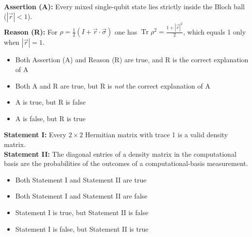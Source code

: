 \documentclass[11pt,a4paper]{article}
\newcommand{\optlabel}[1]{\textbf{(#1)}}
\newenvironment{qitem}[1]{\begin{list}{}{\setlength{\leftmargin}{3.3em}\setlength{\labelwidth}{3.1em}%
  \setlength{\labelsep}{0.2em}\setlength{\topsep}{3pt}\setlength{\parsep}{3pt}}\item[\textbf{Q.#1}\hfill]}{\end{list}}
\newcommand{\qsep}{\par\vspace{2pt}{\color{black!15}\hrule}\vspace{4pt}}
\begin{document}
\begin{qitem}{17}
\textbf{Assertion (A):} Every mixed single-qubit state lies strictly inside the Bloch ball ($|\vec r| < 1$).\\[1mm]
\textbf{Reason (R):} For $\rho = \frac12(I + \vec r\cdot\vec\sigma)$ one has $\operatorname{Tr}\rho^2 = \frac{1 + |\vec r|^2}{2}$, which equals 1 only when $|\vec r| = 1$.
\begin{itemize}[leftmargin=2.6em, labelsep=0.4em, itemsep=2pt, topsep=3pt]
\item[\optlabel{A}] Both Assertion (A) and Reason (R) are true, and R is the correct explanation of A
\item[\optlabel{B}] Both A and R are true, but R is \emph{not} the correct explanation of A
\item[\optlabel{C}] A is true, but R is false
\item[\optlabel{D}] A is false, but R is true
\end{itemize}
\end{qitem}
\qsep

\begin{qitem}{18}
\textbf{Statement I:} Every $2\times2$ Hermitian matrix with trace 1 is a valid density matrix.\\[1mm]
\textbf{Statement II:} The diagonal entries of a density matrix in the computational basis are the probabilities of the outcomes of a
computational-basis measurement.
\begin{itemize}[leftmargin=2.6em, labelsep=0.4em, itemsep=2pt, topsep=3pt]
\item[\optlabel{A}] Both Statement I and Statement II are true
\item[\optlabel{B}] Both Statement I and Statement II are false
\item[\optlabel{C}] Statement I is true, but Statement II is false
\item[\optlabel{D}] Statement I is false, but Statement II is true
\end{itemize}
\end{qitem}
\qsep
\end{document}
